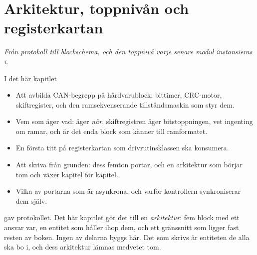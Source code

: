 
\chapter{Arkitektur, toppnivån och registerkartan}
\label{c11:ch}

{\large\itshape Från protokoll till blockschema, och den toppnivå varje senare modul instansieras
i.\par}

\begin{chapterbox}{I det här kapitlet}
\begin{itemize}
  \item Att avbilda CAN-begrepp på hårdvarublock: bittimer, CRC-motor, skiftregister, och den
    ramsekvenserande tillståndsmaskin som styr dem.
  \item Vem som äger vad:  äger \emph{när}, skiftregistren äger bitstoppningen,
     vet ingenting om ramar, och  är det enda block som känner till
    ramformatet.
  \item En första titt på registerkartan som drivrutinsklassen ska konsumera.
  \item Att skriva  från grunden: dess femton portar, och en arkitektur som
    börjar tom och växer kapitel för kapitel.
  \item Vilka av portarna som är asynkrona, och varför kontrollern synkroniserar dem själv.
\end{itemize}
\end{chapterbox}

 gav protokollet. Det här kapitlet gör det till en \emph{arkitektur}: fem block med
ett ansvar var, en entitet som håller ihop dem, och ett gränssnitt som ligger fast resten av boken.
Ingen av delarna byggs här. Det som skrivs är entiteten de alla ska bo i, och dess arkitektur lämnas
medvetet tom.




